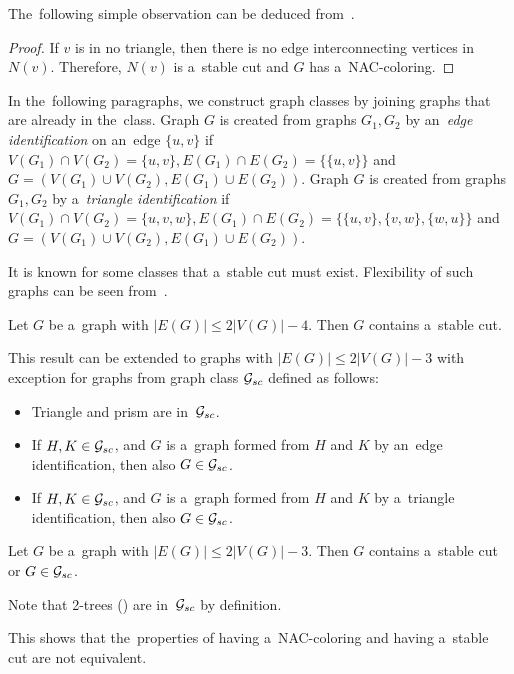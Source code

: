 The~following simple observation can be deduced
from~.
%
%
\begin{proof}
	If \( v \) is in no triangle, then there is no edge interconnecting
	vertices in~\( N(v) \). Therefore, \( N(v) \) is a~stable cut and \( G \)
	has a~NAC-coloring.
\end{proof}

In the~following paragraphs, we construct graph classes by joining graphs
that are already in the~class.
Graph \( G \) is created from graphs \( G_1, G_2 \) by an~\emph{edge identification}
on an~edge \( \{u, v\} \)
if \( V(G_1) \cap V(G_2) = \{u, v\}, E(G_1) \cap E(G_2) = \{\{u, v\}\} \)
and \( G = (V(G_1) \cup V(G_2), E(G_1) \cup E(G_2)) \).
Graph \( G \) is created from graphs \( G_1, G_2 \) by a~\emph{triangle identification}
if \( V(G_1) \cap V(G_2) = \{u, v, w\}, E(G_1) \cap E(G_2) = \{\{u, v\}, \{v, w\}, \{w, u\}\} \)
and \( G = (V(G_1) \cup V(G_2), E(G_1) \cup E(G_2)) \).

It is known for some classes that a~stable cut must exist.
Flexibility of such graphs can be seen from~.
%
\begin{theorem}
	Let \( G \) be a~graph with \( |E(G)| \le 2|V(G)|-4 \).
	Then \( G \) contains a~stable cut.
\end{theorem}
%
This result can be extended to graphs with \( |E(G)| \le 2|V(G)|-3 \) with exception
for graphs from graph class \( \mathcal{G}_{sc} \) defined as follows:
%
\begin{itemize}
	\item Triangle and prism are in~\( \mathcal{G}_{sc} \).
	\item If \( H, K \in \mathcal{G}_{sc} \), and \( G \) is a~graph
	      formed from \( H \) and \( K \) by an~edge identification,
	      then also \( G \in \mathcal{G}_{sc} \).
	\item If \( H, K \in \mathcal{G}_{sc} \), and \( G \) is a~graph
	      formed from \( H \) and \( K \) by a~triangle identification,
	      then also \( G \in \mathcal{G}_{sc} \).
\end{itemize}
%
%
\begin{theorem}
	Let \( G \) be a~graph with \( |E(G)| \le 2|V(G)|-3 \). Then \( G \) contains
	a~stable cut or \( G \in \mathcal{G}_{sc} \).
\end{theorem}
%
Note that 2-trees ()
are in~\( \mathcal{G}_{sc} \) by definition.
%
%
This shows that the~properties of having a~NAC-coloring and having a~stable cut
are not equivalent.


